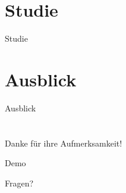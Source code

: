 \documentclass[11pt]{beamer}
\begin{document}
\section{Studie}
\begin{frame}{Studie}
\end{frame}
\section{Ausblick}
\begin{frame}{Ausblick}
\end{frame}
\section*{}
\begin{frame}
  \begin{center}
    Danke für ihre Aufmerksamkeit!
  \end{center}
\end{frame}

\begin{frame}
  \begin{center}
    Demo\\
  \end{center}
\end{frame}
\begin{frame}
  \begin{center}
    Fragen?
  \end{center}
\end{frame}
\end{document}
